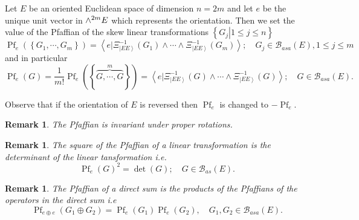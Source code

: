 \documentclass[aps,preprint]{revtex4}%
\newtheorem{remark}[theorem]{Remark}
\begin{document}
Let $E$ be an oriented Euclidean space of dimension $n=2m$ and let $e$ be the
unique unit vector in ${\LARGE \wedge}^{2m}E$ which represents the
orientation. Then we set the value of the Pfaffian of the skew linear
transformations $\left\{  \left.  G_{j}\right\vert 1\leq j\leq n\right\}  $%
\begin{equation}
\operatorname{Pf}_{e}\left(  \left\{  G_{1},\cdots,G_{m}\right\}  \right)
=\left\langle \left.  e\right\vert \Xi_{\left\vert EE\right\rangle }%
^{-1}\left(  G_{1}\right)  \wedge\cdots\wedge\Xi_{\left\vert EE\right\rangle
}^{-1}\left(  G_{m}\right)  \right\rangle ;\quad G_{j}\in\mathcal{B}%
_{asa}\left(  E\right)  ,1\leq j\leq m
\end{equation}
and in particular
\begin{equation}
\operatorname{Pf}_{e}\left(  G\right)  =\frac{1}{m!}\operatorname{Pf}%
_{e}\left(  \left\{  \overset{m}{\overbrace{G,\cdots,G}}\right\}  \right)
=\left\langle \left.  \overset{}{e}\right\vert \Xi_{\left\vert EE\right\rangle
}^{-1}\left(  G\right)  \wedge\cdots\wedge\Xi_{\left\vert EE\right\rangle
}^{-1}\left(  G\right)  \right\rangle ;\quad G\in\mathcal{B}_{asa}\left(
E\right)  .
\end{equation}


Observe that if the orientation of $E$ is reversed then $\operatorname{Pf}%
_{e}$ is changed to $-\operatorname{Pf}_{e}$.

\begin{remark}
The Pfaffian is invariant under proper rotations.
\end{remark}

\begin{remark}
The square of the Pfaffian of a linear transformation is the determinant of
the linear tansformation i.e.
\begin{equation}
\operatorname{Pf}_{e}\left(  G\right)  ^{2}=\det\left(  G\right)  ;\quad
G\in\mathcal{B}_{as}\left(  E\right)  .
\end{equation}

\end{remark}

\begin{remark}
The Pfaffian of a direct sum is the products of the Pfaffians of the operators
in the direct sum i.e
\begin{equation}
\operatorname{Pf}_{e\oplus e}\left(  G_{1}\oplus G_{2}\right)
=\operatorname{Pf}_{e}\left(  G_{1}\right)  \operatorname{Pf}_{e}\left(
G_{2}\right)  ,\quad G_{1},G_{2}\in\mathcal{B}_{asa}\left(  E\right)  .
\end{equation}

\end{remark}
\end{document}
